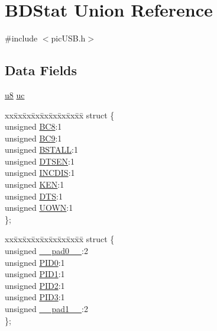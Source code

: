 \hypertarget{union_b_d_stat}{\section{B\-D\-Stat Union Reference}
\label{union_b_d_stat}
}


{\ttfamily \#include $<$pic\-U\-S\-B.\-h$>$}

\subsection*{Data Fields}
\begin{DoxyCompactItemize}
\item 
\hyperlink{p8_2pinguino_2core_2typedef_8h_aed742c436da53c1080638ce6ef7d13de}{u8} \hyperlink{union_b_d_stat_a4fd6f18f3eba5c2129d04a50fe51778f}{uc}
\item 
\begin{tabbing}
xx\=xx\=xx\=xx\=xx\=xx\=xx\=xx\=xx\=\kill
struct \{\\
\>unsigned \hyperlink{union_b_d_stat_a5d5010d284e6c86702a4ce3063f4cca5}{BC8}:1\\
\>unsigned \hyperlink{union_b_d_stat_af499c0fe1fd8eba827eb024bf69841e9}{BC9}:1\\
\>unsigned \hyperlink{union_b_d_stat_a145ee75f12c62d2a89097d18477019f2}{BSTALL}:1\\
\>unsigned \hyperlink{union_b_d_stat_adeff6f5de2d8ca0cfa956560288c3541}{DTSEN}:1\\
\>unsigned \hyperlink{union_b_d_stat_a39604d4252cc3e5f9551bd2cd3b54584}{INCDIS}:1\\
\>unsigned \hyperlink{union_b_d_stat_aaf39e9ac8929e7da9cb427f1b0de0934}{KEN}:1\\
\>unsigned \hyperlink{union_b_d_stat_a74db087bfe32cd33c459191f7a4aeb13}{DTS}:1\\
\>unsigned \hyperlink{union_b_d_stat_abc982c28d59f8e36dbcb06639010169d}{UOWN}:1\\
\}; \\

\end{tabbing}\item 
\begin{tabbing}
xx\=xx\=xx\=xx\=xx\=xx\=xx\=xx\=xx\=\kill
struct \{\\
\>unsigned \hyperlink{union_b_d_stat_adf71f3d8410c1f1dbbc96680a92c49af}{\_\_pad0\_\_}:2\\
\>unsigned \hyperlink{union_b_d_stat_a810a2f6d15fc42c5d1e610b6e927d2eb}{PID0}:1\\
\>unsigned \hyperlink{union_b_d_stat_acefd8c6eba334031c18cd877dfe08bfb}{PID1}:1\\
\>unsigned \hyperlink{union_b_d_stat_aef3d6a9445a3c61d870212360c0a6110}{PID2}:1\\
\>unsigned \hyperlink{union_b_d_stat_a771971768126aebea428ac7194b17fc0}{PID3}:1\\
\>unsigned \hyperlink{union_b_d_stat_acaf2d0924a107ec6e8d2e31febaf66f9}{\_\_pad1\_\_}:2\\
\}; \\


\end{tabbing}
\end{DoxyCompactItemize}
